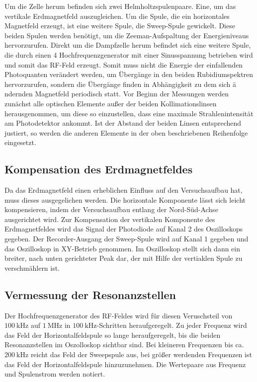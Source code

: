 \noindent Um die Zelle herum befinden sich zwei Helmholtzspulenpaare. Eine, um das vertikale Erdmagnetfeld auszugleichen. Um die Spule, die ein horizontales Magnetfeld
erzeugt, ist eine weitere Spule, die Sweep-Spule gewickelt. Diese beiden Spulen werden
benötigt, um die Zeeman-Aufspaltung der Energieniveaus hervorzurufen.
Direkt um die Dampfzelle herum befindet sich eine weitere Spule, die durch einen 4
Hochfrequenzgenerator mit einer Sinusspannung betrieben wird und somit das RF-Feld
erzeugt. Somit muss nicht die
Energie der einfallenden Photoquanten verändert werden, um Übergänge in den beiden
Rubidiumspektren hervorzurufen, sondern die Übergänge finden in Abhängigkeit zu dem sich ä
ndernden Magnetfeld periodisch statt.
Vor Beginn der Messungen werden zunächst alle optischen Elemente außer der beiden
Kollimationslinsen herausgenommen, um diese so einzustellen, dass eine maximale
Strahlenintensität am Photodetektor ankommt. Ist der Abstand der beiden Linsen
entsprechend justiert, so werden die anderen Elemente in der oben beschriebenen
Reihenfolge eingesetzt.


\subsection{Kompensation des Erdmagnetfeldes}
Da das Erdmagnetfeld einen erheblichen Einfluss auf den Versuchsaufbau hat, muss dieses
ausgegelichen werden. Die horizontale Komponente lässt sich leicht kompensieren, indem
der Versuchsaufbau entlang der Nord-Süd-Achse ausgerichtet wird.
Zur Kompensation der vertikalen Komponente des Erdmagnetfeldes wird das Signal der
Photodiode auf Kanal 2 des Oszilloskops gegeben. Der Recorder-Ausgang der Sweep-Spule
wird auf Kanal 1 gegeben und das Oszilloskop in XY-Betrieb genommen. Im Oszilloskop
stellt sich dann ein breiter, nach unten gerichteter Peak dar, der mit Hilfe der
vertiaklen Spule zu verschmählern ist.

\subsection{Vermessung der Resonanzstellen}
Der Hochfrequenzgenerator des RF-Feldes wird für diesen Veruschsteil von $\SI{100}{\kilo \hertz}$ auf $\SI{1}{\mega \hertz}$ in $\SI{100}{\kilo \hertz}$-Schritten heraufgeregelt.
Zu jeder Frequenz wird das Feld der Horizontalfeldspule so lange heraufgeregelt, bis die
beiden Resonanzstellen im Oszolloskop sichtbar sind. Bei kleineren Frequenzen bis ca.
$\SI{200}{\kilo \hertz}$ reicht das Feld der Sweepspule aus, bei größer werdenden
Frequenzen ist das Feld der Horizontalfeldspule hinzuzunehmen. Die Wertepaare aus
Frequenz und Spulenstrom werden notiert.




